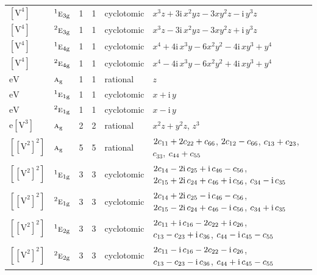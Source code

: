 \documentclass[10pt,a4paper]{article}
\numberwithin{equation}{section}
\newcommand{\irr}[1]{\text{\normalfont\scshape #1}}
\newcommand{\conjpair}[1]{{}^{#1}}
\newcommand{\ptag}[1]{\mathrm{#1}}
\newcommand{\iunit}{\mathrm{i}}
\newcommand{\jahn}[1]{\mathrm{#1}}
\newlength{\fillwidth}\newlength{\cellwidth}\newlength{\colwidth}
\newcommand{\signbreak}{\penalty100\relax}
\begin{document}
{\begin{longtable}{@{}llrrl>{\RaggedRight\arraybackslash}p{\fillwidth}@{}}
$\jahn{[V^{4}]}$ & $\conjpair{1}\irr{e}_{3\ptag{g}}$ & 1 & 1 & cyclotomic & $x^{3}z + 3\iunit{}\,x^{2}yz - 3xy^{2}z - \iunit{}\,y^{3}z$\\
$\jahn{[V^{4}]}$ & $\conjpair{2}\irr{e}_{3\ptag{g}}$ & 1 & 1 & cyclotomic & $x^{3}z - 3\iunit{}\,x^{2}yz - 3xy^{2}z + \iunit{}\,y^{3}z$\\
$\jahn{[V^{4}]}$ & $\conjpair{1}\irr{e}_{4\ptag{g}}$ & 1 & 1 & cyclotomic & $x^{4} + 4\iunit{}\,x^{3}y - 6x^{2}y^{2} - 4\iunit{}\,xy^{3} + y^{4}$\\
$\jahn{[V^{4}]}$ & $\conjpair{2}\irr{e}_{4\ptag{g}}$ & 1 & 1 & cyclotomic & $x^{4} - 4\iunit{}\,x^{3}y - 6x^{2}y^{2} + 4\iunit{}\,xy^{3} + y^{4}$\\
$\jahn{eV}$ & $\irr{a}_{\ptag{g}}$ & 1 & 1 & rational & $z$\\
$\jahn{eV}$ & $\conjpair{1}\irr{e}_{1\ptag{g}}$ & 1 & 1 & cyclotomic & $x + \iunit{}\,y$\\
$\jahn{eV}$ & $\conjpair{2}\irr{e}_{1\ptag{g}}$ & 1 & 1 & cyclotomic & $x - \iunit{}\,y$\\
$\jahn{e[V^{3}]}$ & $\irr{a}_{\ptag{g}}$ & 2 & 2 & rational & $x^{2}z + y^{2}z$, $z^{3}$\\
$\jahn{[[V^{2}]^{2}]}$ & $\irr{a}_{\ptag{g}}$ & 5 & 5 & rational & $2c_{11} +\signbreak 2c_{22} +\signbreak c_{66}$, $2c_{12} -\signbreak c_{66}$, $c_{13} +\signbreak c_{23}$, $c_{33}$, $c_{44} +\signbreak c_{55}$\\
$\jahn{[[V^{2}]^{2}]}$ & $\conjpair{1}\irr{e}_{1\ptag{g}}$ & 3 & 3 & cyclotomic & $2c_{14} -\signbreak 2\iunit{}\,c_{25} +\signbreak \iunit{}\,c_{46} -\signbreak c_{56}$, $2c_{15} +\signbreak 2\iunit{}\,c_{24} +\signbreak c_{46} +\signbreak \iunit{}\,c_{56}$, $c_{34} -\signbreak \iunit{}\,c_{35}$\\
$\jahn{[[V^{2}]^{2}]}$ & $\conjpair{2}\irr{e}_{1\ptag{g}}$ & 3 & 3 & cyclotomic & $2c_{14} +\signbreak 2\iunit{}\,c_{25} -\signbreak \iunit{}\,c_{46} -\signbreak c_{56}$, $2c_{15} -\signbreak 2\iunit{}\,c_{24} +\signbreak c_{46} -\signbreak \iunit{}\,c_{56}$, $c_{34} +\signbreak \iunit{}\,c_{35}$\\
$\jahn{[[V^{2}]^{2}]}$ & $\conjpair{1}\irr{e}_{2\ptag{g}}$ & 3 & 3 & cyclotomic & $2c_{11} +\signbreak \iunit{}\,c_{16} -\signbreak 2c_{22} +\signbreak \iunit{}\,c_{26}$, $c_{13} -\signbreak c_{23} +\signbreak \iunit{}\,c_{36}$, $c_{44} -\signbreak \iunit{}\,c_{45} -\signbreak c_{55}$\\
$\jahn{[[V^{2}]^{2}]}$ & $\conjpair{2}\irr{e}_{2\ptag{g}}$ & 3 & 3 & cyclotomic & $2c_{11} -\signbreak \iunit{}\,c_{16} -\signbreak 2c_{22} -\signbreak \iunit{}\,c_{26}$, $c_{13} -\signbreak c_{23} -\signbreak \iunit{}\,c_{36}$, $c_{44} +\signbreak \iunit{}\,c_{45} -\signbreak c_{55}$\\

\end{longtable}}
\end{document}
